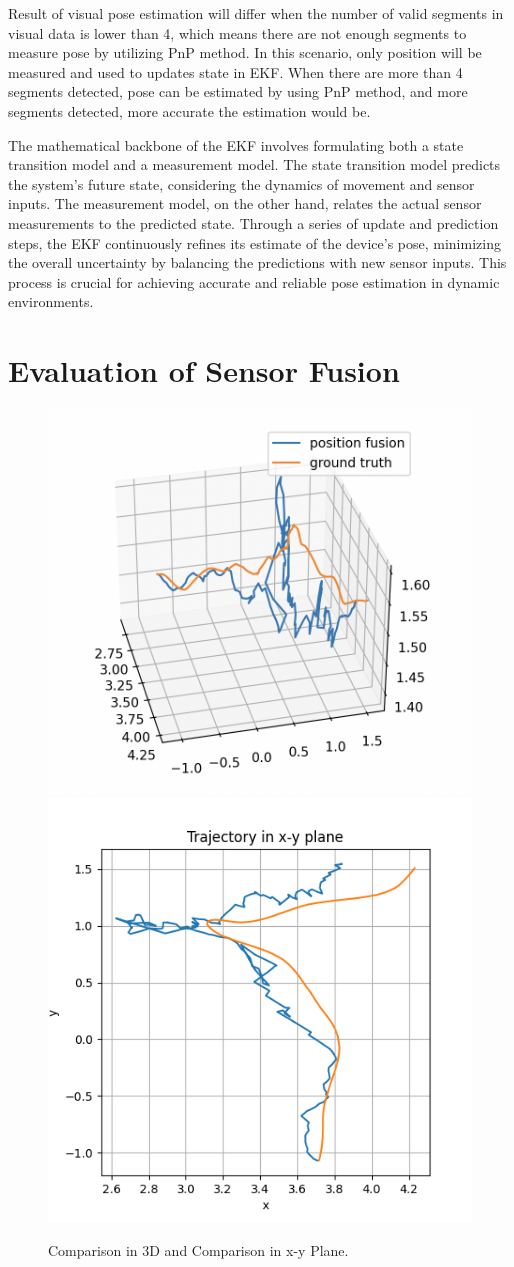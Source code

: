 Result of visual pose estimation  will differ when the number of valid segments in visual data is lower than 4, which means there are not enough segments to measure pose by utilizing PnP method. In this scenario, only position will be measured and used to updates state in EKF. When there are more than 4 segments detected, pose can be estimated by using PnP method, and more segments detected, more accurate the estimation would be. 

The mathematical backbone of the EKF involves formulating both a state transition model and a measurement model. The state transition model predicts the system's future state, considering the dynamics of movement and sensor inputs. The measurement model, on the other hand, relates the actual sensor measurements to the predicted state. Through a series of update and prediction steps, the EKF continuously refines its estimate of the device's pose, minimizing the overall uncertainty by balancing the predictions with new sensor inputs. This process is crucial for achieving accurate and reliable pose estimation in dynamic environments.


\section{Evaluation of Sensor Fusion}


\begin{figure}[H]
    \centering
    \includegraphics[width=.5\linewidth]{Pictures/sensor_fusion/10s_3d_fine.png}\hfill
    \includegraphics[width=.5\linewidth]{Pictures/sensor_fusion/xy_gt_10s_2.png}
    \caption{Comparison in 3D and Comparison in x-y Plane.}
    \label{fig:sensor_fusion_3_1}
\end{figure}

